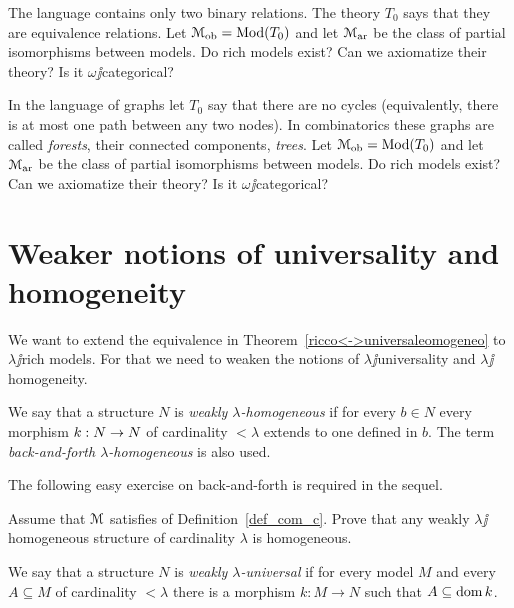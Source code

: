 \documentclass[creche.tex]{subfiles}
\begin{document}
\begin{exercise}
The language contains only two binary relations. The theory $T_0$ says that they are equivalence relations. Let $\EuScript M_{\rm ob}=\mathop{\rm Mod}(T_0)$ and let $\EuScript M_{\rm ar}$ be the class of partial isomorphisms between models. Do rich models exist? Can we axiomatize their theory? Is it $\omega\jj$categorical?\QED
\end{exercise}

\begin{exercise}
In the language of graphs let $T_0$ say that there are no cycles (equivalently, there is at most one path between any two nodes). In combinatorics these graphs are called \textit{forests}, their connected components, \textit{trees}. Let $\EuScript M_{\rm ob}=\mathop{\rm Mod}(T_0)$ and let $\EuScript M_{\rm ar}$  be the class of partial isomorphisms between models. Do rich models exist? Can we axiomatize their theory? Is it $\omega\jj$categorical?\QED
\end{exercise}





\section{Weaker notions of universality and homogeneity}\label{weak}

We want to extend the equivalence in Theorem~\ref{ricco<->universaleomogeneo} to $\lambda\jj$rich models. For that we need to weaken the notions of $\lambda\jj$universality and  $\lambda\jj$homogeneity. 

\begin{definition}
We say that a structure $N$ is \emph{weakly $\lambda$-homogeneous\/} if for every $b\in N$ every morphism $k:N\rightarrow N$ of cardinality $<\lambda$ extends to one defined in $b$. The term \emph{back-and-forth $\lambda$-homogeneous\/} is also used.\QED
\end{definition}

The following easy exercise on back-and-forth is required in the sequel.

\begin{exercise}\label{omogeneo=debolmenteaomogeneo}
Assume that $\EuScript M$ satisfies  of Definition~\ref{def_com_c}. Prove that any weakly $\lambda\jj$ho\-mo\-ge\-ne\-ous structure of cardinality $\lambda$ is homogeneous.\QED
\end{exercise}

\begin{definition}\label{def_weakly_universal}
We say that a structure $N$ is \emph{weakly $\lambda$-universal\/} if for every model $M$ and every $A\subseteq M$ of cardinality $<\lambda$ there is a morphism $k:M\to N$ such that $A\subseteq\mathop{\rm dom} k$.\QED
\end{definition}
\end{document}
